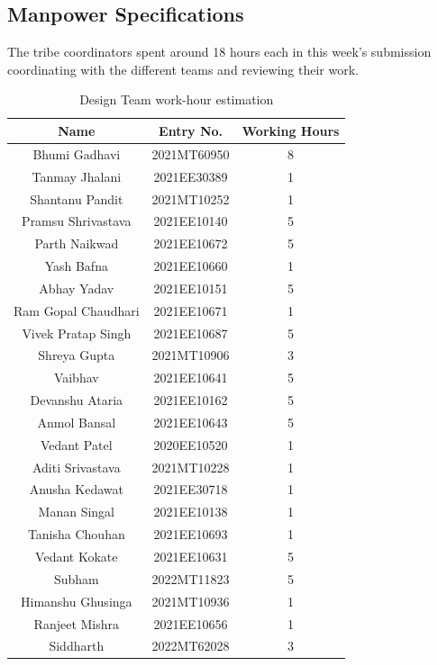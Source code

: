 \documentclass[12pt]{article} %
\begin{document}
\subsection{Manpower Specifications}
The tribe coordinators spent around 18 hours each in this week's submission coordinating with the different teams and reviewing their work.
\begin{table}[h]
\centering
\begin{tabular}{|c|c|c|}
\hline
Name & Entry No. & Working Hours \\
\hline
Bhumi Gadhavi & 2021MT60950 & 8 \\
Tanmay Jhalani & 2021EE30389 & 1 \\
Shantanu Pandit & 2021MT10252 & 1 \\
Pramsu Shrivastava & 2021EE10140 & 5 \\
Parth Naikwad & 2021EE10672 & 5 \\
Yash Bafna & 2021EE10660 & 1 \\
Abhay Yadav & 2021EE10151 & 5 \\
Ram Gopal Chaudhari & 2021EE10671 & 1 \\
Vivek Pratap Singh & 2021EE10687 & 5 \\
Shreya Gupta & 2021MT10906 & 3 \\
Vaibhav & 2021EE10641 & 5 \\
Devanshu Ataria & 2021EE10162 & 5 \\
Anmol Bansal & 2021EE10643 & 5 \\
Vedant Patel & 2020EE10520 & 1 \\
Aditi Srivastava & 2021MT10228 & 1 \\
Anusha Kedawat & 2021EE30718 & 1 \\
Manan Singal & 2021EE10138 & 1 \\
Tanisha Chouhan & 2021EE10693 & 1 \\
Vedant Kokate & 2021EE10631 & 5 \\
Subham & 2022MT11823 & 5 \\
Himanshu Ghusinga & 2021MT10936 & 1 \\
Ranjeet Mishra & 2021EE10656 & 1 \\
Siddharth & 2022MT62028 & 3 \\
\hline
\end{tabular}
\caption{Design Team work-hour estimation}
\label{tab:teamDetails}
\end{table}
\end{document}
